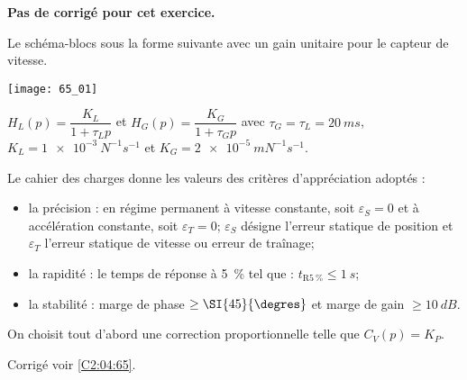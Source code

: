 \normaltrue \difficilefalse \tdifficilefalse
\correctionfalse

\setcounter{question}{0}


\ifcorrection
\else
\textbf{Pas de corrigé pour cet exercice.}
\fi

\ifprof
\else 

Le schéma-blocs sous la forme suivante avec un gain unitaire pour le capteur
de vitesse.

\begin{center}
\texttt{[image: 65\_01]}
\end{center}

$H_L(p)=\dfrac{K_L}{1+\tau_L p}$ et $H_G(p)=\dfrac{K_G}{1+\tau_G p}$  avec $\tau_G=\tau_L = \SI{20}{ms}$, $K_L = \SI{1e-3}{N^{-1}s^{-1}}$ et $K_G = \SI{2e-5}{mN^{-1}s^{-1}}$.


Le cahier des charges donne les valeurs des critères d'appréciation adoptés :
\begin{itemize}
\item la précision : en régime permanent à vitesse constante, soit $\varepsilon_S=0$ et à accélération constante, soit $\varepsilon_T=0$; $\varepsilon_S$ désigne l'erreur statique de position et $\varepsilon_T$ l'erreur statique de vitesse ou erreur de traînage;
\item la rapidité : le temps de réponse à \SI{5}{\%} tel que : $t_{\text{R}\SI{5}{\%}}\leq \SI{1}{s}$;
\item la stabilité : marge de phase $\geq \SI{45}{\degres}$ et marge de gain $\geq \SI{10}{dB}$.
\end{itemize}

On choisit tout d'abord une correction proportionnelle telle que $C_V(p)=K_P$.
\fi

\ifprof
\else 
\fi

\ifprof
\else 
\fi

\ifprof
\else 
\fi

\ifprof
\else

\noindent\footnotesize
\normalsize

\begin{flushright}
\footnotesize{Corrigé  voir \ref{C2:04:65}.}
\end{flushright}%
\fi